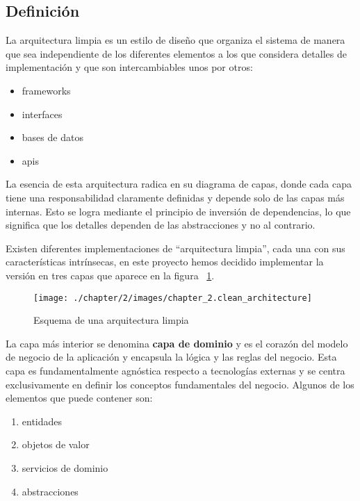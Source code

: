 \subsection*{Definición}
La arquitectura limpia es un estilo de diseño que organiza el sistema de manera que sea independiente de los diferentes
elementos a los que considera detalles de implementación y que son intercambiables unos por otros:

\begin{itemize}
    \item frameworks
    \item interfaces
    \item bases de datos
    \item apis
\end{itemize}

La esencia de esta arquitectura radica en su diagrama de capas, donde cada capa tiene una responsabilidad claramente
definidas y depende solo de las capas más internas.
Esto se logra mediante el principio de inversión de dependencias, lo que significa que los detalles dependen de las
abstracciones y no al contrario.

Existen diferentes implementaciones de ``arquitectura limpia'', cada una con sus características intrínsecas, en este
proyecto hemos decidido implementar la versión en tres capas que aparece en la figura
~\ref{fig:chapter_2.clean_architecture}.

\begin{figure}[ht]
    \begin{center}
        \texttt{[image: ./chapter/2/images/chapter\_2.clean\_architecture]}
        \caption{Esquema de una arquitectura limpia}
        \label{fig:chapter_2.clean_architecture}
    \end{center}
\end{figure}

La capa más interior se denomina \textbf{capa de dominio} y es el corazón del modelo de negocio de la aplicación y
encapsula la lógica y las reglas del negocio.
Esta capa es fundamentalmente agnóstica respecto a tecnologías externas y se centra exclusivamente en definir los
conceptos fundamentales del negocio.
Algunos de los elementos que puede contener son:
\begin{enumerate}
    \item entidades
    \item objetos de valor
    \item servicios de dominio
    \item abstracciones
\end{enumerate}

